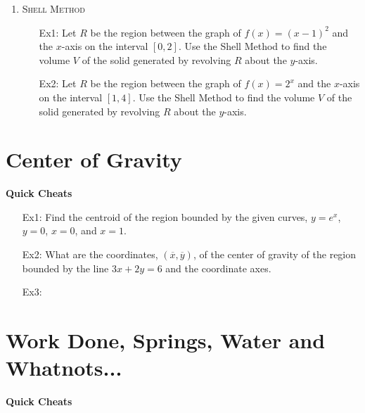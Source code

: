 \documentclass[12pt]{amsart}
\theoremstyle{plain}
\theoremstyle{definition}
\begin{document}
\begin{enumerate}
\item \textsc{Shell Method}
    \begin{itemize}
    \setlength{\itemsep}{200pt}
    \item[Ex1:] Let $R$ be the region between the graph of $f(x) = (x-1)^2$ and the $x$-axis on the interval $[0,2]$. Use the Shell Method to find the volume $V$ of the solid generated by revolving $R$ about the $y$-axis.
    \item[Ex2:] Let $R$ be the region between the graph of $f(x) = 2^x$     and the $x$-axis on the interval $[1,4]$. Use the Shell Method to find the volume   $V$ of the solid generated by revolving $R$ about the $y$-axis.
    \item[]
    \end{itemize}

\end{enumerate}

\section*{Center of Gravity}              


\begin{mdframed}[style=MyFrame]
\begin{center}                 
\textbf{Quick Cheats}        
\end{center}                  
\end{mdframed}

\begin{enumerate}
\setlength{\itemsep}{200pt} 
\item[Ex1:] Find the centroid of the region bounded by the given curves, $y= e^x $, $y=0$, $x=0$, and $x=1$.               
\item[Ex2:] What are the coordinates, $(\overline{x},\overline{y})$, of the center of gravity of the region bounded by the line $3x +2y =6$ and the coordinate axes.               
\item[Ex3:] 
\item[]
\end{enumerate}



\section*{Work Done, Springs, Water and Whatnots...}             

\begin{mdframed}[style=MyFrame]
\begin{center}               
\textbf{Quick Cheats}          
\end{center}                   

\end{mdframed}
\end{document}
